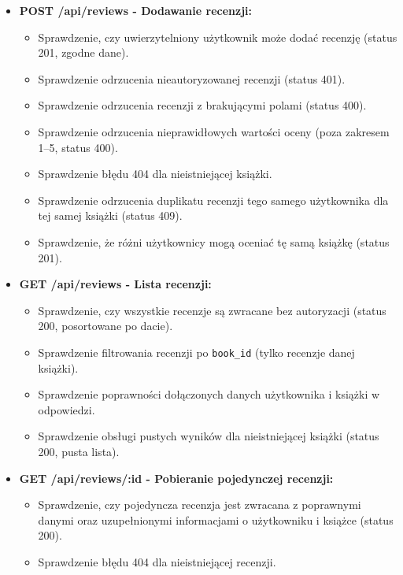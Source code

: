\documentclass{article}
\begin{document}
\begin{itemize}
    \item \textbf{POST /api/reviews - Dodawanie recenzji:}
    \begin{itemize}
        \item Sprawdzenie, czy uwierzytelniony użytkownik może dodać recenzję (status 201, zgodne dane).
        \item Sprawdzenie odrzucenia nieautoryzowanej recenzji (status 401).
        \item Sprawdzenie odrzucenia recenzji z brakującymi polami (status 400).
        \item Sprawdzenie odrzucenia nieprawidłowych wartości oceny (poza zakresem 1–5, status 400).
        \item Sprawdzenie błędu 404 dla nieistniejącej książki.
        \item Sprawdzenie odrzucenia duplikatu recenzji tego samego użytkownika dla tej samej książki (status 409).
        \item Sprawdzenie, że różni użytkownicy mogą oceniać tę samą książkę (status 201).
    \end{itemize}

    \item \textbf{GET /api/reviews - Lista recenzji:}
    \begin{itemize}
        \item Sprawdzenie, czy wszystkie recenzje są zwracane bez autoryzacji (status 200, posortowane po dacie).
        \item Sprawdzenie filtrowania recenzji po \texttt{book\_id} (tylko recenzje danej książki).
        \item Sprawdzenie poprawności dołączonych danych użytkownika i książki w odpowiedzi.
        \item Sprawdzenie obsługi pustych wyników dla nieistniejącej książki (status 200, pusta lista).
    \end{itemize}

    \item \textbf{GET /api/reviews/:id - Pobieranie pojedynczej recenzji:}
    \begin{itemize}
        \item Sprawdzenie, czy pojedyncza recenzja jest zwracana z poprawnymi danymi oraz uzupełnionymi informacjami o użytkowniku i książce (status 200).
        \item Sprawdzenie błędu 404 dla nieistniejącej recenzji.
    \end{itemize}


\end{itemize}
\end{document}
